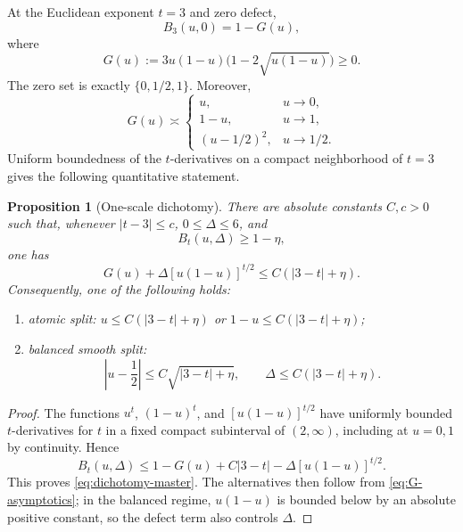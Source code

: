 \documentclass[11pt,reqno]{amsart}
\numberwithin{equation}{section}
\newtheorem{proposition}[proposition]{Proposition}
\theoremstyle{definition}
\theoremstyle{remark}
\begin{document}
At the Euclidean exponent $t=3$ and zero defect,
\begin{equation}\label{eq:B3}
  B_3(u,0)
  =1-G(u),
\end{equation}
where
\begin{equation}\label{eq:Gu}
  G(u):=3u(1-u)\bigl(1-2\sqrt{u(1-u)}\bigr)\ge0.
\end{equation}
The zero set is exactly $\{0,1/2,1\}$.  Moreover,
\begin{equation}\label{eq:G-asymptotics}
  G(u)\asymp
  \begin{cases}
    u,&u\to0,\\
    1-u,&u\to1,\\
    (u-1/2)^2,&u\to1/2.
  \end{cases}
\end{equation}
Uniform boundedness of the $t$-derivatives on a compact neighborhood of
$t=3$ gives the following quantitative statement.

\begin{proposition}[One-scale dichotomy]\label{prop:one-scale-dichotomy}
There are absolute constants $C,c>0$ such that, whenever
$|t-3|\le c$, $0\le\Delta\le6$, and
\begin{equation}\label{eq:near-gain}
  B_t(u,\Delta)\ge1-\eta,
\end{equation}
one has
\begin{equation}\label{eq:dichotomy-master}
  G(u)+\Delta[u(1-u)]^{t/2}
  \le C(|3-t|+\eta).
\end{equation}
Consequently, one of the following holds:
\begin{enumerate}[label=\textup{(\roman*)}]
  \item \emph{atomic split:}
  $u\le C(|3-t|+\eta)$ or
  $1-u\le C(|3-t|+\eta)$;
  \item \emph{balanced smooth split:}
  \[
    \left|u-\frac12\right|
    \le C\sqrt{|3-t|+\eta},
    \qquad
    \Delta\le C(|3-t|+\eta).
  \]
\end{enumerate}
\end{proposition}

\begin{proof}
The functions $u^t$, $(1-u)^t$, and
$[u(1-u)]^{t/2}$ have uniformly bounded $t$-derivatives for $t$ in a fixed
compact subinterval of $(2,\infty)$, including at $u=0,1$ by continuity.
Hence
\[
  B_t(u,\Delta)
  \le1-G(u)+C|3-t|-\Delta[u(1-u)]^{t/2}.
\]
This proves \eqref{eq:dichotomy-master}.  The alternatives then follow
from \eqref{eq:G-asymptotics}; in the balanced regime,
$u(1-u)$ is bounded below by an absolute positive constant, so the defect
term also controls $\Delta$.
\end{proof}
\end{document}
